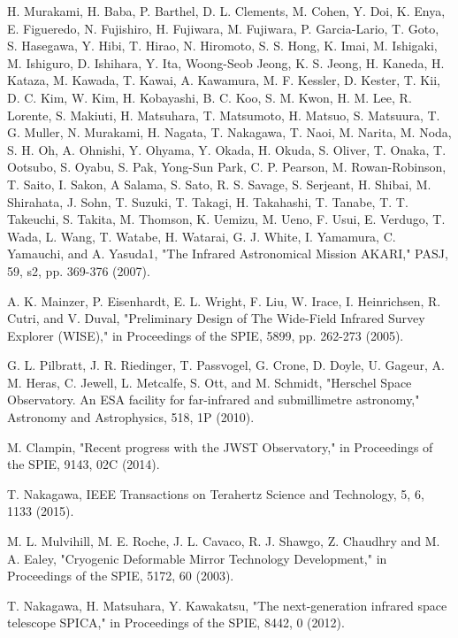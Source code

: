 \documentclass[a4paper]{article}
\begin{document}
\begin{thebibliography}{99}
H. Murakami, H. Baba, P. Barthel, D. L. Clements,
M. Cohen, Y. Doi, K. Enya, E. Figueredo, N. Fujishiro, H. Fujiwara, M. Fujiwara, P. Garcia-Lario, T. Goto, S. Hasegawa, Y. Hibi, T. Hirao, N. Hiromoto, S. S. Hong, K. Imai, M. Ishigaki, M. Ishiguro, D. Ishihara, Y. Ita, Woong-Seob Jeong, K. S. Jeong, H. Kaneda, H. Kataza, M. Kawada, T. Kawai, A. Kawamura, M. F. Kessler, D. Kester, T. Kii, D. C. Kim, W. Kim, H. Kobayashi, B. C. Koo, S. M. Kwon, H. M. Lee, R. Lorente, S. Makiuti, H. Matsuhara, T. Matsumoto, H. Matsuo, S. Matsuura, T. G. Muller, N. Murakami, H. Nagata, T. Nakagawa, T. Naoi, M. Narita, M. Noda, S. H. Oh, A. Ohnishi, Y. Ohyama, Y. Okada, H. Okuda, S. Oliver, T. Onaka, T. Ootsubo, S. Oyabu, S. Pak, Yong-Sun Park, C. P. Pearson,
M. Rowan-Robinson, T. Saito, I. Sakon, A Salama, S. Sato, R. S. Savage, S. Serjeant, H. Shibai,
M. Shirahata, J. Sohn, T. Suzuki, T. Takagi, H. Takahashi, T. Tanabe, T. T. Takeuchi, S. Takita, M. Thomson, K. Uemizu, M. Ueno, F. Usui,
E. Verdugo, T. Wada, L. Wang, T. Watabe, H. Watarai, G. J. White, I. Yamamura, C. Yamauchi, and A. Yasuda1, "The Infrared Astronomical Mission AKARI," PASJ, 59, s2, pp. 369-376 (2007). %

A. K. Mainzer, P. Eisenhardt, E. L. Wright, F. Liu, W. Irace, I. Heinrichsen, R. Cutri, and V. Duval, "Preliminary Design of The Wide-Field Infrared Survey Explorer (WISE)," in Proceedings of the SPIE, 5899, pp. 262-273 (2005). %

G. L. Pilbratt, J. R. Riedinger, T. Passvogel, G. Crone, D. Doyle, U. Gageur, A. M. Heras, C. Jewell, L. Metcalfe, S. Ott, and M. Schmidt, "Herschel Space Observatory. An ESA facility for far-infrared and submillimetre astronomy," Astronomy and Astrophysics, 518, 1P (2010). %

M. Clampin, "Recent progress with the JWST Observatory," in Proceedings of the SPIE, 9143, 02C (2014). %

T. Nakagawa, IEEE Transactions on Terahertz Science and Technology, 5, 6, 1133 (2015).   %

M. L. Mulvihill, M. E. Roche, J. L. Cavaco, R. J. Shawgo, Z. Chaudhry and M. A. Ealey, "Cryogenic Deformable Mirror Technology Development," in Proceedings of the SPIE, 5172, 60 (2003).

T. Nakagawa, H. Matsuhara, Y. Kawakatsu, "The next-generation infrared space telescope SPICA," in Proceedings of the SPIE, 8442, 0 (2012).


\end{thebibliography}
\end{document}
